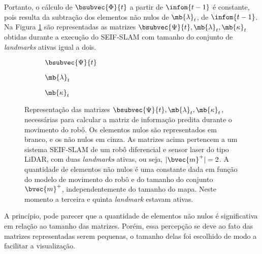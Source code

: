 Portanto, o cálculo de $\bsubvec{\Phi}{t}$ a partir de $\infom{t-1}$
é constante, pois resulta da subtração dos elementos não nulos 
de $\mb{\lambda}_t$, de $\infom{t-1}$. Na Figura 
\ref{fig:seif-slam-prediction-variables} são representadas as matrizes $\bsubvec{\Psi}{t}, \mb{\lambda}_t, \mb{\kappa}_t$ obtidas durante a 
execução do SEIF-SLAM com tamanho do conjunto de \textit{landmarks} ativas 
igual a dois. 
\begin{figure}[h]
  \begin{subfigure}{.30\textwidth}
    
    \caption{$\bsubvec{\Psi}{t}$}
  \end{subfigure}
  \hfill
  \begin{subfigure}{.30\textwidth}
    
    \caption{$\mb{\lambda}_t$}
  \end{subfigure}
  \hfill
  \begin{subfigure}{.30\textwidth}
    
    \caption{$\mb{\kappa}_{t}$}
  \end{subfigure}
  \caption{Representação das matrizes $\bsubvec{\Psi}{t}, \mb{\lambda}_t, \mb{\kappa}_t$, necessárias para calcular a 
  matriz de informação predita durante o movimento do robô. Os elementos 
  nulos são representados em branco, e os não nulos em cinza. 
  As matrizes acima 
  pertencem a um sistema SEIF-SLAM de um robô diferencial e 
  sensor laser do tipo LiDAR, com duas \textit{landmarks} ativas, ou seja, $\lvert \bvec{m}^+ \rvert = 2$. A quantidade de elementos não nulos 
  é uma constante dada em função do modelo de movimento do robô e do tamanho do conjunto $\bvec{m}^+$, independentemente do tamanho do mapa. Neste momento a terceira e quinta \textit{landmark} estavam ativas.}
  \label{fig:seif-slam-prediction-variables}
\end{figure}

A princípio, pode parecer que a quantidade de elementos não 
nulos é significativa em relação ao tamanho das matrizes. Porém, essa 
percepção se deve ao fato das matrizes representadas serem pequenas, o tamanho delas foi escolhido de modo a facilitar a visualização.

